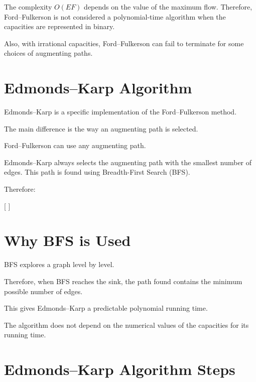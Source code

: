\documentclass[12pt,a4paper]{article}
\begin{document}
The complexity $O(EF)$ depends on the value of the maximum flow.
Therefore, Ford--Fulkerson is not considered a polynomial-time
algorithm when the capacities are represented in binary.

Also, with irrational capacities, Ford--Fulkerson can fail to terminate
for some choices of augmenting paths.

\section{Edmonds--Karp Algorithm}

Edmonds--Karp is a specific implementation of the
Ford--Fulkerson method.

The main difference is the way an augmenting path is selected.

Ford--Fulkerson can use any augmenting path.

Edmonds--Karp always selects the augmenting path with the smallest
number of edges. This path is found using Breadth-First Search (BFS).

Therefore:

[
]

\section{Why BFS is Used}

BFS explores a graph level by level.

Therefore, when BFS reaches the sink, the path found contains the
minimum possible number of edges.

This gives Edmonds--Karp a predictable polynomial running time.

The algorithm does not depend on the numerical values of the
capacities for its running time.

\section{Edmonds--Karp Algorithm Steps}
\end{document}
